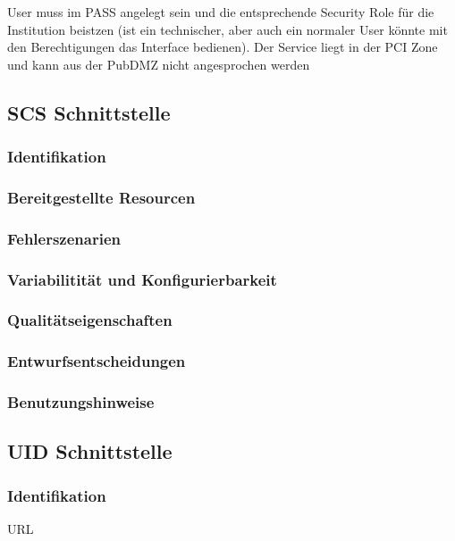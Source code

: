 User muss im PASS angelegt sein und die entsprechende Security Role für die Institution beistzen (ist ein technischer, aber auch ein normaler User könnte mit den Berechtigungen das Interface bedienen).
Der Service liegt in der PCI Zone und kann aus der PubDMZ nicht angesprochen werden
	
\subsection{SCS Schnittstelle}

\subsubsection{Identifikation}

\subsubsection{Bereitgestellte Resourcen}

\subsubsection{Fehlerszenarien}

\subsubsection{Variabilitität und Konfigurierbarkeit}

\subsubsection{Qualitätseigenschaften}

\subsubsection{Entwurfsentscheidungen} 

\subsubsection{Benutzungshinweise} 

\subsection{UID Schnittstelle}

\subsubsection{Identifikation}
URL

